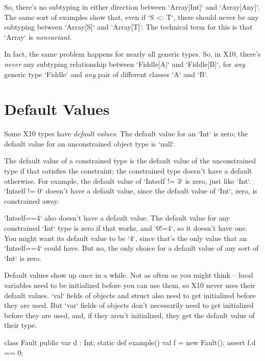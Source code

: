 So, there's no subtyping in either direction between \xcd`Array[Int]` and
\xcd`Array[Any]`. The same sort of examples show that, even if \xcd`S <: T`,
there should never be any subtyping between \xcd`Array[S]` and \xcd`Array[T]`.  
The technical term for this is that \xcd`Array` is {\em nonvariant}.  

In fact, the same problem happens for nearly all generic types.  So, in X10,
there's {\em never}  any subtyping relationship between \xcd`Fiddle[A]` and 
\xcd`Fiddle[B]`, for {\em any} generic type \xcd`Fiddle` and {\em any}
pair of different classes \xcd`A` and \xcd`B`.



\section{Default Values}
\label{sect:DefaultValues}

Some X10 types have {\em default values}.  The default value for an \xcd`Int`
is zero; the default value for an unconstrained object type is \xcd`null`.  


The default value of a constrained type is the default value of the
unconstrained type if that satisfies the constraint; the constrained type
doesn't have a default otherwise. 
For example, the default value of \xcd`Int{self != 3}` is zero, just like
\xcd`Int`.  \xcd`Int{self != 0}` doesn't have a default value, since the
default value of \xcd`Int`, zero, is constrained away. 

\xcd`Int{self==4}` also doesn't have a default value.  The default value for
any constrained \xcd`Int` type is zero if that works, and \xcd`0!=4`, so it
doesn't have one.  You might want its default value to be \xcd`4`, since
that's the only value that an \xcd`Int{self==4}` could have. But no, the
only choice for a default value of any sort of \xcd`Int` is zero.


Default values show up once in a while.  Not as often as you might think --
local variables need to be initialized before you can use them, so X10 never
uses their default values.  \xcd`val` fields of objects and struct also need
to get initialized before they are used.  But \xcd`var` fields of objects
don't necessarily need to get initialized before they are used, and, if they
aren't initialized, they get the default value of their type.


\begin{xtennum}[]
 class Fault {
  public var d : Int;
  static def example() {
    val f = new Fault();
    assert f.d == 0; 
  }
}
\end{xtennum}


